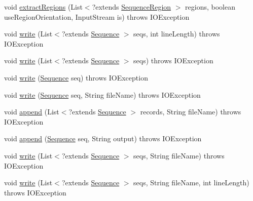 \begin{DoxyCompactItemize}
void \hyperlink{classbroad_1_1core_1_1sequence_1_1_fasta_sequence_i_o_a1dc3bdc056f3b5abf31667bac3cca310}{extract\+Regions} (List$<$?extends \hyperlink{classbroad_1_1core_1_1sequence_1_1_sequence_region}{Sequence\+Region} $>$ regions, boolean use\+Region\+Orientation, Input\+Stream is)  throws I\+O\+Exception
\item 
void \hyperlink{classbroad_1_1core_1_1sequence_1_1_fasta_sequence_i_o_a51b41e65ea299c8d55095a3143705746}{write} (List$<$?extends \hyperlink{classbroad_1_1core_1_1sequence_1_1_sequence}{Sequence} $>$ seqs, int line\+Length)  throws I\+O\+Exception 
\item 
void \hyperlink{classbroad_1_1core_1_1sequence_1_1_fasta_sequence_i_o_a13ddcf5f555eb5f54fbf64a5f4598228}{write} (List$<$?extends \hyperlink{classbroad_1_1core_1_1sequence_1_1_sequence}{Sequence} $>$ seqs)  throws I\+O\+Exception 
\item 
void \hyperlink{classbroad_1_1core_1_1sequence_1_1_fasta_sequence_i_o_a731d49cafdfb0fb901cecbe8bd5bb53d}{write} (\hyperlink{classbroad_1_1core_1_1sequence_1_1_sequence}{Sequence} seq)  throws I\+O\+Exception 
\item 
void \hyperlink{classbroad_1_1core_1_1sequence_1_1_fasta_sequence_i_o_ae724528e8d020b01437c10aeae9d68a9}{write} (\hyperlink{classbroad_1_1core_1_1sequence_1_1_sequence}{Sequence} seq, String file\+Name)  throws I\+O\+Exception
\item 
void \hyperlink{classbroad_1_1core_1_1sequence_1_1_fasta_sequence_i_o_ad6f4da2133f3c03f22f20a826ed9be36}{append} (List$<$?extends \hyperlink{classbroad_1_1core_1_1sequence_1_1_sequence}{Sequence} $>$ records, String file\+Name)  throws I\+O\+Exception 
\item 
void \hyperlink{classbroad_1_1core_1_1sequence_1_1_fasta_sequence_i_o_acb32eb4f18d008ff3e4d3d10ffdf2d04}{append} (\hyperlink{classbroad_1_1core_1_1sequence_1_1_sequence}{Sequence} seq, String output)  throws I\+O\+Exception 
\item 
void \hyperlink{classbroad_1_1core_1_1sequence_1_1_fasta_sequence_i_o_ad2ea4040ed62b7c01f299af1f92c7771}{write} (List$<$?extends \hyperlink{classbroad_1_1core_1_1sequence_1_1_sequence}{Sequence} $>$ seqs, String file\+Name)  throws I\+O\+Exception
\item 
void \hyperlink{classbroad_1_1core_1_1sequence_1_1_fasta_sequence_i_o_a6bc2f692aabf0340a841edeb498d4291}{write} (List$<$?extends \hyperlink{classbroad_1_1core_1_1sequence_1_1_sequence}{Sequence} $>$ seqs, String file\+Name, int line\+Length)  throws I\+O\+Exception
\item 

\end{DoxyCompactItemize}
